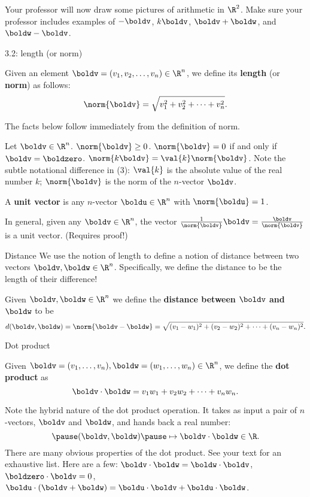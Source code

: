 \begin{frame}
Your professor will now draw some pictures of arithmetic in $\R^2$. 
\bspace
Make sure your professor includes examples of $-\boldv$, $k\boldv$, $\boldv+\boldw$, and $\boldw-\boldv$. 
\end{frame}
\begin{frame}{3.2: length (or norm)}
\footnotesize
\begin{definition}
Given an element $\boldv=(v_1,v_2,\dots ,v_n)\in\R^n$, we define its {\bf length} (or {\bf norm}) as follows:
\[
\norm{\boldv}=\sqrt{v_1^2+v_2^2+\cdots +v_n^2}.
\]
\end{definition}
\pause The facts below follow immediately from the definition of norm. 
\begin{theorem}
Let $\boldv\in\R^n$. 
\bb[(1)]
\ii $\norm{\boldv}\geq 0$.
\ii $\norm{\boldv}=0$ if and only if $\boldv=\boldzero$.
\ii $\norm{k\boldv}=\val{k}\norm{\boldv}$.
\ee
\pause Note the subtle notational difference in (3): $\val{k}$ is the absolute value of the real number $k$; $\norm{\boldv}$ is the norm of the $n$-vector $\boldv$. 
\end{theorem}
\pause
\begin{definition}
A {\bf unit vector} is any $n$-vector $\boldu\in\R^n$ with $\norm{\boldu}=1$. 

In general, given any $\boldv\in\R^n$, the vector 
$
\frac{1}{\norm{\boldv}}\boldv=\frac{\boldv}{\norm{\boldv}}
$
is a unit vector. (Requires proof!)
\end{definition}


\end{frame}
\begin{frame}{Distance}
We use the notion of length to define a notion of distance between two vectors $\boldv, \boldw\in\R^n$. Specifically, we define the distance to be the length of their difference! 
\pause\begin{definition}
Given $\boldv,\boldw\in\R^n$ we define the {\bf distance between $\boldv$ and $\boldw$} to be 
\[
d(\boldv,\boldw)=\norm{\boldv-\boldw}=\sqrt{(v_1-w_1)^2+(v_2-w_2)^2+\cdots +(v_n-w_n)^2}.
\]
\end{definition}
\end{frame}
\begin{frame}{Dot product}
\begin{definition}
Given $\boldv=(v_1,\dots,v_n), \boldw=(w_1,\dots,w_n)\in\R^n$, we define the {\bf dot product} as 
\[
\boldv\cdot\boldw=v_1w_1+v_2w_2+\cdots +v_nw_n.
\]
\end{definition}
\pause Note the hybrid nature of the dot product operation. It takes as input a pair of $n$-vectors, $\boldv$ and $\boldw$, and hands back a real number:
\[
\pause (\boldv,\boldw)\pause\mapsto \boldv\cdot\boldw\in\R.
\]
\pause There are many obvious properties of the dot product. See your text for an exhaustive list. Here are a few:
\bb
\ii $\boldv\cdot\boldw=\boldw\cdot\boldv$,
\ii $\boldzero\cdot\boldv=0$,
\ii $\boldu\cdot(\boldv+\boldw)=\boldu\cdot\boldv+\boldu\cdot\boldw$.
\ee
\end{frame}
